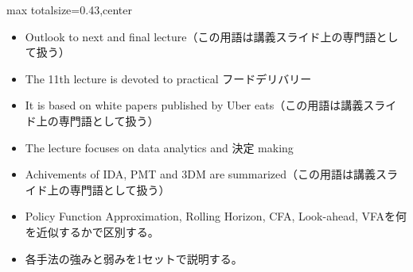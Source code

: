

\clearpage
{}
\begin{minipage}[t]{0.405\textwidth}
\begin{adjustbox}{max totalsize={\textwidth}{0.43\textheight},center}
\begin{minipage}{\textwidth}\scriptsize
{}\begin{itemize}
\item Outlook to next and final lecture（この用語は講義スライド上の専門語として扱う）
\item The 11th lecture is devoted to practical フードデリバリー
\item It is based on white papers published by Uber eats（この用語は講義スライド上の専門語として扱う）
\item The lecture focuses on data analytics and 決定 making
\item Achivements of IDA, PMT and 3DM are summarized（この用語は講義スライド上の専門語として扱う）
\end{itemize}\begin{itemize}
\item Policy Function Approximation, Rolling Horizon, CFA, Look-ahead, VFAを何を近似するかで区別する。
\item 各手法の強みと弱みを1セットで説明する。
\end{itemize}
\end{minipage}
\end{adjustbox}
\end{minipage}\hfill
